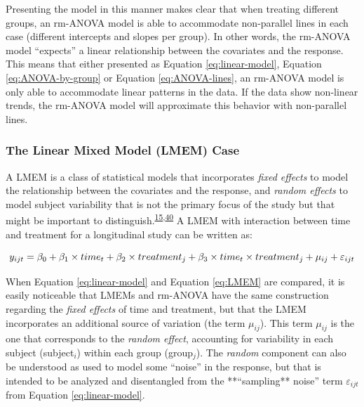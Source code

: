 \documentclass[
]{article}
\begin{document}
Presenting the model in this manner makes clear that when treating different groups, an rm-ANOVA model is able to accommodate non-parallel lines in each case (different intercepts and slopes per group). In other words, the rm-ANOVA model ``expects'' a linear relationship between the covariates and the response. This means that either presented as Equation \eqref{eq:linear-model}, Equation \eqref{eq:ANOVA-by-group} or Equation \eqref{eq:ANOVA-lines}, an rm-ANOVA model is only able to accommodate linear patterns in the data. If the data show non-linear trends, the rm-ANOVA model will approximate this behavior with non-parallel lines.

\hypertarget{LMEM-case}{%
\subsubsection{The Linear Mixed Model (LMEM) Case}\label{LMEM-case}}

A LMEM is a class of statistical models that incorporates \emph{fixed effects} to model the relationship between the covariates and the response, and \emph{random effects} to model subject variability that is not the primary focus of the study but that might be important to distinguish.\textsuperscript{\protect\hyperlink{ref-pinheiro2006}{15},\protect\hyperlink{ref-west2014}{40}} A LMEM with interaction between time and treatment for a longitudinal study can be written as:

\begin{equation}
y_{ijt} = \beta_0+ \beta_1 \times time_{t} + \beta_2 \times treatment_{j} + \beta_3 \times time_{t}\times treatment_{j}+\mu_{ij} +\varepsilon_{ijt}\\ 
\label{eq:LMEM}
\end{equation}

When Equation \eqref{eq:linear-model} and Equation \eqref{eq:LMEM} are compared, it is easily noticeable that LMEMs and rm-ANOVA have the same construction regarding the \emph{fixed effects} of time and treatment, but that the LMEM incorporates an additional source of variation (the term \(\mu_{ij}\)). This term \(\mu_{ij}\) is the one that corresponds to the \emph{random effect}, accounting for variability in each subject (subject\(_i\)) within each group (group\(_j\)). The \emph{random} component can also be understood as used to model some ``noise'' in the response, but that is intended to be analyzed and disentangled from the **``sampling** noise'' term \(\varepsilon_{ijt}\) from Equation \eqref{eq:linear-model}.
\end{document}
